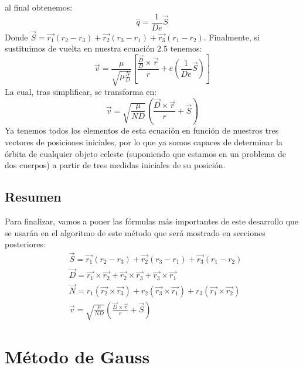 \documentclass{article}
\numberwithin{equation}{section}
\begin{document}
al final obtenemos: 
\begin{equation}
    \hat{q}=\frac{1}{De}\overrightarrow{S} 
\end{equation}
Donde $\overrightarrow{S}=\overrightarrow{r_{1}}(r_{2}-r_{3})+\overrightarrow{r_{2}}(r_{3}-r_{1})+\overrightarrow{r_{3}}(r_{1}-r_{2})$. 
Finalmente, si sustituimos de vuelta en nuestra ecuación 2.5 tenemos: 
\begin{equation*}
    \overrightarrow{v}=\frac{\mu}{\sqrt{\mu\frac{N}{D}}}\left[\frac{\frac{\overrightarrow{D}}{D}\times\overrightarrow{r}}{r}+e\left(\frac{1}{De}\overrightarrow{S}\right) \right] 
\end{equation*}
La cual, tras simplificar, se transforma en: 
\begin{equation}
    \overrightarrow{v}=\sqrt{\frac{\mu}{ND}}\left(\frac{\overrightarrow{D}\times\overrightarrow{r}}{r}+\overrightarrow{S}\right) 
\end{equation}
Ya tenemos todos los elementos de esta ecuación en función de 
nuestros tres vectores de posiciones iniciales, por lo que 
ya somos capaces de determinar la órbita de cualquier 
objeto celeste (suponiendo que estamos en un problema de dos 
cuerpos) a partir de tres medidas iniciales de su posición. 
\subsection{Resumen}
Para finalizar, vamos a poner las fórmulas más importantes 
de este desarrollo que se usarán en el algoritmo de este 
método que será mostrado en secciones posteriores:
\begin{align*}
    &\overrightarrow{S}=\overrightarrow{r_{1}}(r_{2}-r_{3})+\overrightarrow{r_{2}}(r_{3}-r_{1})+\overrightarrow{r_{3}}(r_{1}-r_{2}) \\
    &\overrightarrow{D}=\overrightarrow{r_{1}}\times\overrightarrow{r_{2}}+\overrightarrow{r_{2}}\times\overrightarrow{r_{3}}+\overrightarrow{r_{3}}\times\overrightarrow{r_{1}} \\
    &\overrightarrow{N}=r_{1}(\overrightarrow{r_{2}}\times\overrightarrow{r_{3}})+r_{2}(\overrightarrow{r_{3}}\times\overrightarrow{r_{1}})+r_{3}(\overrightarrow{r_{1}}\times\overrightarrow{r_{2}}) \\
    &\overrightarrow{v}=\sqrt{\frac{\mu}{ND}}\left(\frac{\overrightarrow{D}\times\overrightarrow{r}}{r}+\overrightarrow{S}\right) 
\end{align*}
\section{Método de Gauss}
\end{document}
